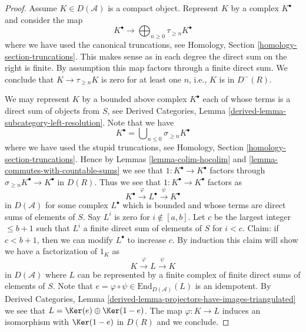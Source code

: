 \begin{proof}
Assume $K \in D(\mathcal{A})$ is a compact object. Represent $K$ by a complex
$K^\bullet$ and consider the map
$$
K^\bullet
\longrightarrow
\bigoplus\nolimits_{n \geq 0} \tau_{\geq n} K^\bullet
$$
where we have used the canonical truncations, see
Homology, Section \ref{homology-section-truncations}.
This makes sense as in each degree the direct sum on the right is finite.
By assumption this map factors through a finite direct sum.
We conclude that $K \to \tau_{\geq n} K$ is zero for at least one $n$,
i.e., $K$ is in $D^{-}(R)$.

\medskip\noindent
We may represent $K$ by a bounded above complex $K^\bullet$ each of whose
terms is a direct sum of objects from $S$, see
Derived Categories, Lemma \ref{derived-lemma-subcategory-left-resolution}.
Note that we have
$$
K^\bullet = \bigcup\nolimits_{n \leq 0} \sigma_{\geq n}K^\bullet
$$
where we have used the stupid truncations, see
Homology, Section \ref{homology-section-truncations}.
Hence by
Lemmas \ref{lemma-colim-hocolim} and \ref{lemma-commutes-with-countable-sums}
we see that $1 : K^\bullet \to K^\bullet$ factors through
$\sigma_{\geq n}K^\bullet \to K^\bullet$ in $D(R)$.
Thus we see that $1 : K^\bullet \to K^\bullet$ factors as
$$
K^\bullet \xrightarrow{\varphi} L^\bullet \xrightarrow{\psi} K^\bullet
$$
in $D(\mathcal{A})$ for some complex $L^\bullet$ which is bounded and
whose terms are direct sums of elements of $S$. Say $L^i$ is zero for
$i \not \in [a, b]$. Let $c$ be the largest integer $\leq b + 1$ such
that $L^i$ a finite direct sum of elements of $S$ for $i < c$.
Claim: if $c < b + 1$, then we can modify $L^\bullet$ to increase $c$.
By induction this claim will show we have a factorization
of $1_K$ as
$$
K \xrightarrow{\varphi} L \xrightarrow{\psi} K
$$
in $D(\mathcal{A})$ where $L$ can be represented by a finite
complex of finite direct sums of elements of $S$. Note that
$e = \varphi \circ \psi \in \text{End}_{D(\mathcal{A})}(L)$
is an idempotent. By Derived Categories,
Lemma \ref{derived-lemma-projectors-have-images-triangulated}
we see that $L = \Ker(e) \oplus \Ker(1 - e)$.
The map $\varphi : K \to L$ induces an isomorphism with
$\Ker(1 - e)$ in $D(R)$ and we conclude.


\end{proof}
